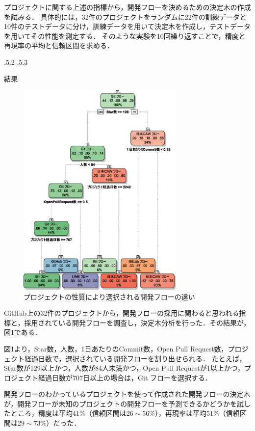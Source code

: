 \documentclass[uplatex,twocolumn]{jsarticle}
\makeatletter
\renewcommand{\section}{%
    \if@slide\clearpage\fi
    \@startsection{section}{1}{\z@}%
    {\Cvs \@plus.5\Cdp \@minus.2\Cdp}%
    {.5\Cvs \@plus.3\Cdp}%
    {\normalfont\raggedright}}
\makeatother
\begin{document}
プロジェクトに関する上述の指標から，開発フローを決めるための決定木の作成を試みる．
具体的には，32件のプロジェクトをランダムに22件の訓練データと10件のテストデータに分け，訓練データを用いて決定木を作成し，テストデータを用いてその性能を測定する．
そのような実験を10回繰り返すことで，精度と再現率の平均と信頼区間を求める．

\section{結果}

\begin{figure}[H]
\includegraphics[width=8.2cm,clip]{decisiontree.eps}
\caption{プロジェクトの性質により選択される開発フローの違い}\label{決定木}
\end{figure}


GitHub上の32件のプロジェクトから，開発フローの採用に関わると思われる指標と，採用されている開発フローを調査し，決定木分析を行った．その結果が，図1である．

図1より，Star数，人数，1日あたりのCommit数，Open Pull Request数，プロジェクト経過日数で，選択されている開発フローを割り出せられる．
たとえば，Star数が129以上かつ，人数が84人未満かつ，Open Pull Requestが1以上かつ，プロジェクト経過日数が707日以上の場合は，Git フローを選択する．


開発フローのわかっているプロジェクトを使って作成された開発フローの決定木が，開発フローが未知のプロジェクトの開発フローを予測できるかどうかを試したところ，精度は平均$41$\%（信頼区間は$26\sim 56$\%），再現率は平均$51$\%（信頼区間は$29\sim 73$\%）だった．
\end{document}
